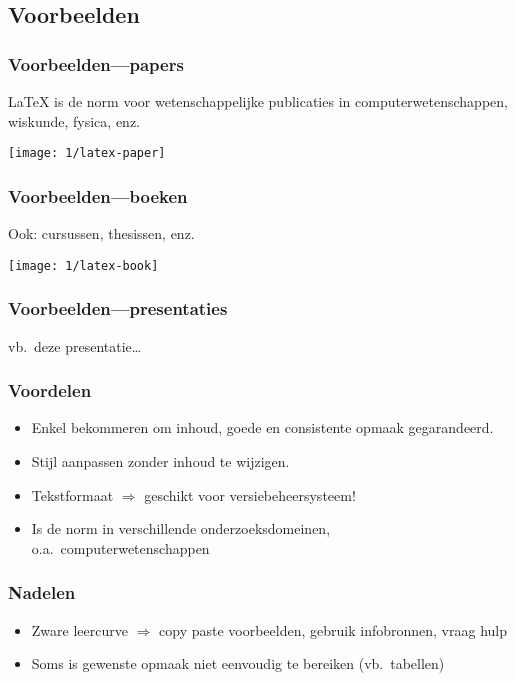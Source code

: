 \documentclass[aspectratio=169]{beamer}
\begin{document}
\subsection{Voorbeelden}

\begin{frame}
  \frametitle{Voorbeelden---papers}

  {\LaTeX} is de norm voor wetenschappelijke publicaties in computerwetenschappen, wiskunde, fysica, enz.

  \begin{center}
    \texttt{[image: 1/latex-paper]}
  \end{center}

\end{frame}

\begin{frame}
  \frametitle{Voorbeelden---boeken}

  Ook: cursussen, thesissen, enz.

  \begin{center}
    \texttt{[image: 1/latex-book]}
  \end{center}

\end{frame}

\begin{frame}
  \frametitle{Voorbeelden---presentaties}

  \begin{center}
    vb.\ deze presentatie\ldots
  \end{center}

\end{frame}

\begin{frame}
  \frametitle{Voordelen}

  \begin{itemize}
    \item<+-> Enkel bekommeren om inhoud, goede en consistente opmaak gegarandeerd.
    \item<+-> Stijl aanpassen zonder inhoud te wijzigen.
    \item<+-> Tekstformaat \(\Rightarrow\) geschikt voor versiebeheersysteem!
    \item<+-> Is de norm in verschillende onderzoeksdomeinen, o.a.\ computerwetenschappen
  \end{itemize}
\end{frame}

\begin{frame}
  \frametitle{Nadelen}

  \begin{itemize}
    \item<+-> Zware leercurve \(\Rightarrow\) copy paste voorbeelden, gebruik infobronnen, vraag hulp
    \item<+-> Soms is gewenste opmaak niet eenvoudig te bereiken (vb.~tabellen)
  \end{itemize}

\end{frame}
\end{document}
